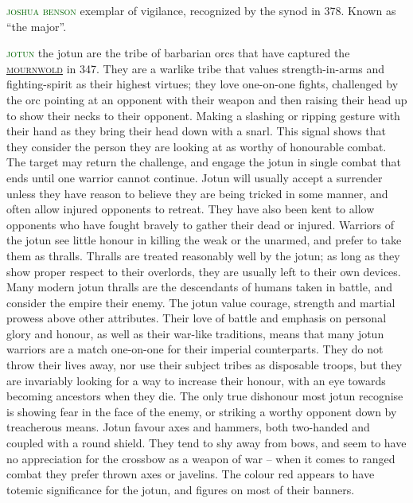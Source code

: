 \documentclass[twoside,11pt,b5paper,twocolumn]{scrbook}
\newcommand{\estcab}[1]{\textsc{\textcolor{marron}{#1}}}
\renewcommand{\paragraph}[1]{\par\noindent\markboth{#1}{#1}\estcab{\textcolor{darkgreen}{#1}}\label{#1} }
\newcommand{\see}[1]{{\estcab{\hyperref[#1]{#1}}}}
\begin{document}
\paragraph{joshua benson} exemplar of vigilance, recognized by the synod in 378. Known as “the major”.
\paragraph{jotun} the jotun are the tribe of barbarian orcs that have captured the \see{mournwold} in 347. They are a warlike tribe that values strength-in-arms and fighting-spirit as their highest virtues; they love one-on-one fights, challenged by the orc pointing at an opponent with their weapon and then raising their head up to show their necks to their opponent. Making a slashing or ripping gesture with their hand as they bring their head down with a snarl. This signal shows that they consider the person they are looking at as worthy of honourable combat. The target may return the challenge, and engage the jotun in single combat that ends until one warrior cannot continue. Jotun will usually accept a surrender unless they have reason to believe they are being tricked in some manner, and often allow injured opponents to retreat. They have also been kent to allow opponents who have fought bravely to gather their dead or injured. Warriors of the jotun see little honour in killing the weak or the unarmed, and prefer to take them as thralls. Thralls are treated reasonably well by the jotun; as long as they show proper respect to their overlords, they are usually left to their own devices. Many modern jotun thralls are the descendants of humans taken in battle, and consider the empire their enemy. The jotun value courage, strength and martial prowess above other attributes. Their love of battle and emphasis on personal glory and honour, as well as their war-like traditions, means that many jotun warriors are a match one-on-one for their imperial counterparts. They do not throw their lives away, nor use their subject tribes as disposable troops, but they are invariably looking for a way to increase their honour, with an eye towards becoming ancestors when they die. The only true dishonour most jotun recognise is showing fear in the face of the enemy, or striking a worthy opponent down by treacherous means. Jotun favour axes and hammers, both two-handed and coupled with a round shield. They tend to shy away from bows, and seem to have no appreciation for the crossbow as a weapon of war – when it comes to ranged combat they prefer thrown axes or javelins. The colour red appears to have totemic significance for the jotun, and figures on most of their banners. 
\end{document}
